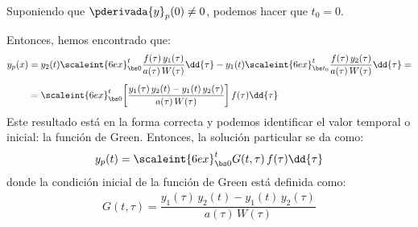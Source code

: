 Suponiendo que $\pderivada{y}_{p} (0) \neq 0$, podemos hacer que $t_{0} = 0$.
\par
Entonces, hemos encontrado que:
\begin{align}
\begin{aligned}[b]
y_{p} (x) &= y_{2} (t) \scaleint{6ex}_{\bs 0}^{t} \dfrac{f (\tau) \, y_{1} (\tau)}{a (\tau) \, W (\tau)} \dd{\tau} - y_{1} (t) \scaleint{6ex}_{\bs t_{0}}^{t} \dfrac{f (\tau) \, y_{2} (\tau)}{a (\tau) \, W (\tau)} \dd{\tau} = \\[0.5em]
&= \scaleint{6ex}_{\bs 0}^{t} \bigg[ \dfrac{y_{1} (\tau) \, y_{2} (t) - y_{1} (t) \, y_{2} (\tau)}{a (\tau) \, W (\tau)} \bigg] \, f (\tau) \dd{\tau}
\end{aligned}
\label{eq:ecuacion_07_19}
\end{align}
Este resultado está en la forma correcta y podemos identificar el valor temporal o inicial: la función de Green. Entonces, la solución particular se da como:
\begin{align}
y_{p} (t) = \scaleint{6ex}_{\bs 0}^{t} G (t, \tau) \, f (\tau) \dd{\tau}
\label{eq:ecuacion_07_20}
\end{align}
donde la condición inicial de la función de Green está definida como:
\begin{align*}
G (t, \tau) = \dfrac{y_{1} (\tau) \, y_{2} (t) - y_{1} (t) \, y_{2} (\tau)}{a (\tau) \, W (\tau)}
\end{align*}

